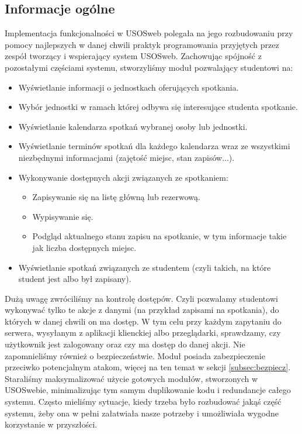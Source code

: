 \documentclass[licencjacka]{pracamgr}
\begin{document}
\subsection{Informacje ogólne}
Implementacja funkcjonalności w USOSweb polegała na jego rozbudowaniu przy pomocy najlepszych w danej chwili praktyk programowania przyjętych przez zespół tworzący i wspierający system USOSweb. Zachowując spójność z pozostałymi częściami systemu, stworzyliśmy moduł pozwalający studentowi na:
\begin{itemize}
  \item{Wyświetlanie informacji o jednostkach oferujących spotkania.}
  \item{Wybór jednostki w ramach której odbywa się interesujące studenta spotkanie.}
  \item{Wyświetlanie kalendarza spotkań wybranej osoby lub jednostki.}
  \item{Wyświetlanie terminów spotkań dla każdego kalendarza wraz ze wszystkimi niezbędnymi informacjami (zajętość miejsc, stan zapisów...).}
  \item{Wykonywanie dostępnych akcji związanych ze spotkaniem:
  \begin{itemize}
    \item{Zapisywanie się na listę główną lub rezerwową.}
    \item{Wypisywanie się.}
    \item{Podgląd aktualnego stanu zapisu na spotkanie, w tym informacje takie jak liczba dostępnych miejsc.}
  \end{itemize}
}
\item{Wyświetlanie spotkań związanych ze studentem (czyli takich, na które student jest albo był zapisany).}
\end{itemize}

Dużą uwagę zwróciliśmy na kontrolę dostępów. Czyli pozwalamy studentowi wykonywać tylko te akcje z danymi (na przykład zapisami na spotkania), do których w danej chwili on ma dostęp. W tym celu przy każdym zapytaniu do serwera, wysyłanym z aplikacji klienckiej albo przeglądarki, sprawdzamy, czy użytkownik jest zalogowany oraz czy ma dostęp do danej akcji. Nie zapomnieliśmy również o bezpieczeństwie. Moduł posiada zabezpieczenie przeciwko potencjalnym atakom, więcej na ten temat w sekcji \ref{subsec:bezpiecz}. Staraliśmy maksymalizować użycie gotowych modułów, stworzonych w USOSwebie, minimalizując tym samym duplikowanie kodu i redundancje całego systemu. Często mieliśmy sytuacje, kiedy trzeba było rozbudować jakąś część systemu, żeby ona w pełni załatwiała nasze potrzeby i umożliwiała wygodne korzystanie w przyszłości.
\end{document}
